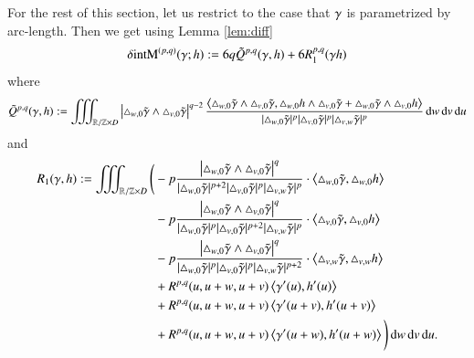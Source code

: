 \section{\secD}

For the rest of this section, let us restrict to the case that $ \g$ is parametrized by arc-length.
Then we get using Lemma \ref{lem:diff} 
\begin{align*}
 \delta \E (\gamma;h) := 6q \tilde Q^{p,q} (\gamma,h) + 6 R^{p,q}_1 (\gamma h)
\end{align*}
where
\begin{multline*}
 \tilde Q^{p,q}(\gamma,h):= \iiint_{\mathbb R / \mathbb Z \times D} \left|\T w0 \wedge \T v0\right|^{q-2}  \frac {\sp{\T w0 \wedge \T v0 ,\T[h] w0 \wedge \T v0 + \T w0 \wedge \T[h] v0 }}{|\T w0|^{p}|\T v0|^p |\T vw|^p}   
\d w \d v \d u
\end{multline*}
and \begin{align*}
  R_1 (\gamma,h) := \iiint_{\mathbb R / \mathbb Z \times D} \Bigg(
  &- p \frac {\left|\T w0 \wedge \T v0 \right|^q}{|\T w0|^{p+2}|\T v0|^p |\T vw|^p}  \cdot  \sp{\T w0, \T[h] w0} \\
  &- p \frac {\left|\T w0 \wedge \T v0 \right|^q}{|\T w0|^{p}|\T v0|^{p+2} |\T vw|^p}  \cdot  \sp{\T v0, \T[h] v0} \\
  &- p \frac {\left|\T w0 \wedge \T v0 \right|^q}{|\T w0|^{p}|\T v0|^p |\T vw|^{p+2}}  \cdot  \sp{\T vw, \T[h] vw} \\
  &+ R^{p,q}(u, u+w, u+v) \sp{\dg (u), \dh(u)} \\
  &+ R^{p,q}(u, u+w, u+v) \sp{\dg (u+v),\dh(u+v)} \\
  &+ R^{p,q}(u, u+w, u+v) \sp{\dg (u+w),\dh(u+w)}
 \Bigg)\d w \d v \d u.
\end{align*}

